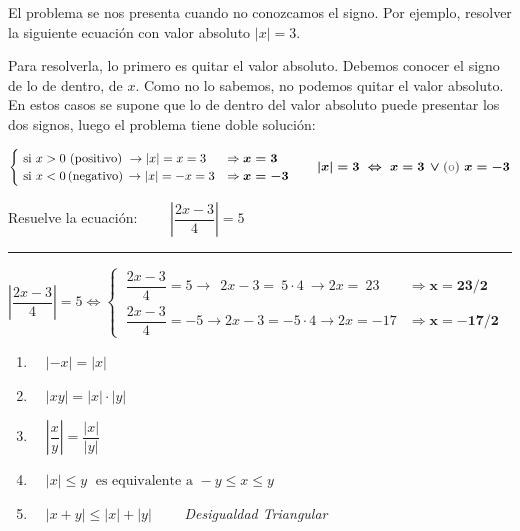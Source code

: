  El problema se nos presenta cuando no conozcamos el signo. Por ejemplo, resolver la siguiente ecuación con valor absoluto $|x|=3$.
 
Para resolverla, lo primero es quitar el valor absoluto. Debemos conocer el signo de lo de dentro, de $x$. Como no lo sabemos, no podemos quitar el valor absoluto. En estos casos se supone que lo de dentro del valor absoluto puede presentar los dos signos, luego el problema tiene doble solución:

$\begin{cases}
\text{ si } x>0 \ (\text{positivo})\ \to |x|=x=3  & \Rightarrow \boldsymbol{x=3}
\\ 
\text{ si } x<0 \, (\text{negativo})\, \to |x|=-x=3  & \Rightarrow \boldsymbol{x=-3}
\end{cases} \qquad  \boldsymbol{ |x|= 3 \ \Leftrightarrow \ x=3 \, \vee \textcolor{gris}{(\text{o})} \ x=-3 }$

\vspace{5mm}
\begin{miejercicio}

Resuelve la ecuación: $\qquad \left| \dfrac{2x-3}{4} \right| = 5$	

\vspace{2mm}
\rule{250pt}{0.1pt}
\vspace{2mm}

$\left| \dfrac{2x-3}{4} \right| = 5 \Leftrightarrow \begin{cases}
\ \dfrac{2x-3}{4} = 5 \to \ \ 2x-3=\ 5\cdot 4\ \to 2x=\ 23 & \Rightarrow \boldsymbol{x=23/2}
\\
\ \dfrac{2x-3}{4} = -5 \to  2x-3=-5\cdot 4\to 2x=-17 & \Rightarrow \boldsymbol{x=-17/2}
 \end{cases}$


\end{miejercicio}


\vspace{5mm}
\begin{theorem} 	
	
	\begin{enumerate}
		\item $\quad  |-x|=|x|$
		\item $\quad |xy|=|x|\cdot|y|$
		\item $\quad \left| \dfrac x y \right| = \dfrac {|x|}{|y|}$
		\item $\quad |x|\le y\;  \mbox{ es equivalente a } -y\le x \le y $
		\item $\quad |x+y|\le|x|+|y|\qquad$ \emph{Desigualdad Triangular}
	\end{enumerate}
\end{theorem}	

